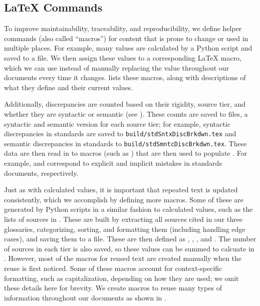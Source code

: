 \subsection[LaTeX Commands]{\LaTeX{} Commands}\label{macros}
To improve maintainability, traceability, and reproducibility, we define
helper commands (also called ``macros'') for content that is prone to change
or used in multiple places. For example, many values are calculated by a Python
script and saved to a file. We then assign these values to a corresponding
\LaTeX{} macro, which we can use instead of manually replacing the value
throughout our documents every time it changes.  lists
these macros, along with descriptions of what they define and their current
values.



Additionally, discrepancies are counted based on their rigidity, source tier,
and whether they are syntactic or semantic (see
).
These counts are saved to files, a syntactic and semantic version for each
source tier; for example, syntactic discrepancies in standards are saved to
\texttt{build/stdSntxDiscBrkdwn.tex} and semantic discrepancies in standards to
\texttt{build/stdSmntcDiscBrkdwn.tex}. These data are then read in to macros
(such as ) that are then used to populate
. For example,
 and  correspond to
explicit and implicit mistakes in standards documents, respectively.

\label{text-macros}
Just as with calculated values, it is important that repeated text is updated
consistently, which we accomplish by defining more macros. Some of these are
generated by Python scripts in a similar fashion to calculated values, such as
the lists of sources in . These are built by extracting all
sources cited in our three glossaries, categorizing, sorting, and formatting
them (including handling edge cases), and saving them to a file. These are then
defined as , , , and
.
The number of sources in each tier is also saved, so these values can be summed
to calcuate  in . However, most of the
macros for reused text are created manually when the reuse is first noticed.
Some of these macros account for context-specific formatting, such as
capitalization, depending on how they are used; we omit these details here for
brevity. We create macros to reuse many types of information throughout our
documents as shown in .


